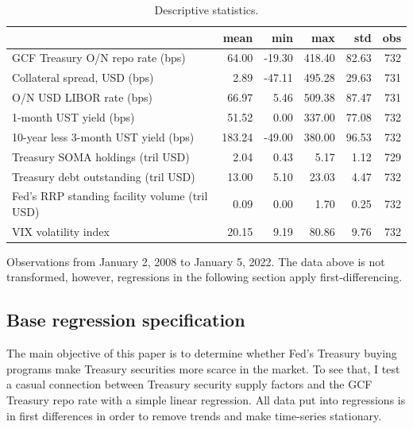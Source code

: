 \documentclass[11pt,a4paper,english,oneside]{article}
\begin{document}
\begin{table}[!h] \centering
\begin{threeparttable}
\caption{Descriptive statistics.}
\begin{tabular}{lrrrrr}
\toprule
{} &    mean &    min &     max &    std &  obs \\
\midrule
GCF Treasury O/N repo rate (bps) &   64.00 & -19.30 &  418.40 &  82.63 &  732 \\
Collateral spread, USD (bps) &    2.89 & -47.11 &  495.28 &  29.63 &  731 \\
O/N USD LIBOR rate (bps) &   66.97 &   5.46 &  509.38 &  87.47 &  731 \\
1-month UST yield (bps) &   51.52 &   0.00 &  337.00 &  77.08 &  732 \\
10-year less 3-month UST yield (bps) &  183.24 & -49.00 &  380.00 &  96.53 &  732 \\
Treasury SOMA holdings (tril USD) &    2.04 &   0.43 &    5.17 &   1.12 &  729 \\
Treasury debt outstanding (tril USD) &   13.00 &   5.10 &   23.03 &   4.47 &  732 \\
Fed's RRP standing facility volume (tril USD) &    0.09 &   0.00 &    1.70 &   0.25 &  732 \\
VIX volatility index &   20.15 &   9.19 &   80.86 &   9.76 &  732 \\
\bottomrule
\end{tabular}
Observations from January 2, 2008 to January 5, 2022. The data above is not transformed, however, regressions in the following section apply first-differencing.
\label{table:stats}
\end{threeparttable}
\end{table}

\subsection{Base regression specification} \label{sec:base}

The main objective of this paper is to determine whether Fed's Treasury buying programs make Treasury securities more scarce in the market. To see that, I test a casual connection between Treasury security supply factors and the GCF Treasury repo rate with a simple linear regression. All data put into regressions is in first differences in order to remove trends and make time-series stationary.
\end{document}
